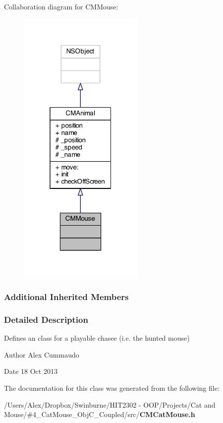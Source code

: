 Collaboration diagram for C\-M\-Mouse\-:
\nopagebreak
\begin{figure}[H]
\begin{center}
\leavevmode
\includegraphics[width=172pt]{interface_c_m_mouse__coll__graph}
\end{center}
\end{figure}
\subsubsection*{Additional Inherited Members}


\subsubsection{Detailed Description}
Defines an class for a playable chasee (i.\-e. the hunted mouse) 

\begin{DoxyAuthor}{Author}
Alex Cummaudo 
\end{DoxyAuthor}
\begin{DoxyDate}{Date}
18 Oct 2013 
\end{DoxyDate}


The documentation for this class was generated from the following file\-:\begin{DoxyCompactItemize}
\item 
/\-Users/\-Alex/\-Dropbox/\-Swinburne/\-H\-I\-T2302 -\/ O\-O\-P/\-Projects/\-Cat and Mouse/\#4\-\_\-\-Cat\-Mouse\-\_\-\-Obj\-C\-\_\-\-Coupled/src/{\bf C\-M\-Cat\-Mouse.\-h}\end{DoxyCompactItemize}
